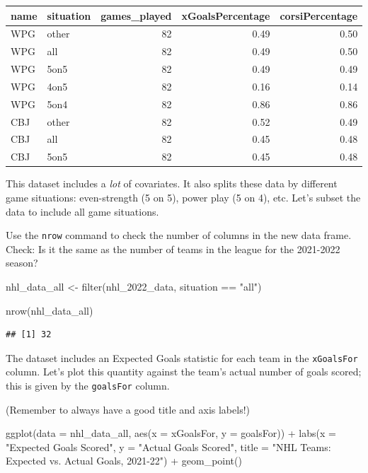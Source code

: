 \documentclass[
  11pt,
]{book}
\newenvironment{Shaded}{\begin{snugshade}}{\end{snugshade}}
\newcommand{\AttributeTok}[1]{\textcolor[rgb]{0.77,0.63,0.00}{#1}}
\newcommand{\FunctionTok}[1]{\textcolor[rgb]{0.00,0.00,0.00}{#1}}
\newcommand{\NormalTok}[1]{#1}
\newcommand{\OtherTok}[1]{\textcolor[rgb]{0.56,0.35,0.01}{#1}}
\newcommand{\SpecialCharTok}[1]{\textcolor[rgb]{0.00,0.00,0.00}{#1}}
\newcommand{\StringTok}[1]{\textcolor[rgb]{0.31,0.60,0.02}{#1}}
\theoremstyle{definition}
\theoremstyle{definition}
\theoremstyle{definition}
\theoremstyle{definition}
\theoremstyle{remark}
\begin{document}
\begin{table}
\centering
\begin{tabular}[t]{l|l|r|r|r}
\hline
name & situation & games\_played & xGoalsPercentage & corsiPercentage\\
\hline
WPG & other & 82 & 0.49 & 0.50\\
\hline
WPG & all & 82 & 0.49 & 0.50\\
\hline
WPG & 5on5 & 82 & 0.49 & 0.49\\
\hline
WPG & 4on5 & 82 & 0.16 & 0.14\\
\hline
WPG & 5on4 & 82 & 0.86 & 0.86\\
\hline
CBJ & other & 82 & 0.52 & 0.49\\
\hline
CBJ & all & 82 & 0.45 & 0.48\\
\hline
CBJ & 5on5 & 82 & 0.45 & 0.48\\
\hline
\end{tabular}
\end{table}

This dataset includes a \emph{lot} of covariates. It also splits these data by different game situations: even-strength (5 on 5), power play (5 on 4), etc. Let's subset the data to include all game situations.

Use the \texttt{nrow} command to check the number of columns in the new data frame. Check: Is it the same as the number of teams in the league for the 2021-2022 season?

\begin{Shaded}
\begin{Highlighting}[]
\NormalTok{nhl\_data\_all }\OtherTok{\textless{}{-}} \FunctionTok{filter}\NormalTok{(nhl\_2022\_data, situation }\SpecialCharTok{==} \StringTok{"all"}\NormalTok{)}

\FunctionTok{nrow}\NormalTok{(nhl\_data\_all)}
\end{Highlighting}
\end{Shaded}

\begin{verbatim}
## [1] 32
\end{verbatim}

The dataset includes an Expected Goals statistic for each team in the \texttt{xGoalsFor} column. Let's plot this quantity against the team's actual number of goals scored; this is given by the \texttt{goalsFor} column.

(Remember to always have a good title and axis labels!)

\begin{Shaded}
\begin{Highlighting}[]
\FunctionTok{ggplot}\NormalTok{(}\AttributeTok{data =}\NormalTok{ nhl\_data\_all, }\FunctionTok{aes}\NormalTok{(}\AttributeTok{x =}\NormalTok{ xGoalsFor, }\AttributeTok{y =}\NormalTok{ goalsFor)) }\SpecialCharTok{+} \FunctionTok{labs}\NormalTok{(}\AttributeTok{x =} \StringTok{"Expected Goals Scored"}\NormalTok{,}
    \AttributeTok{y =} \StringTok{"Actual Goals Scored"}\NormalTok{, }\AttributeTok{title =} \StringTok{"NHL Teams: Expected vs. Actual Goals, 2021{-}22"}\NormalTok{) }\SpecialCharTok{+}
    \FunctionTok{geom\_point}\NormalTok{()}
\end{Highlighting}
\end{Shaded}
\end{document}
